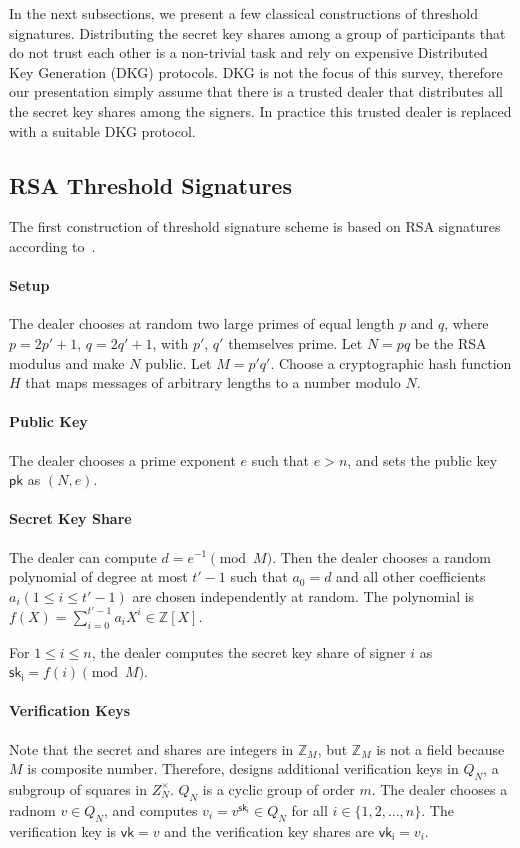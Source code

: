 \par In the next subsections, we present a few classical constructions of threshold signatures. Distributing the secret key shares among a group of participants that do not trust each other is a non-trivial task and rely on expensive Distributed Key Generation (DKG) protocols. DKG is not the focus of this survey, therefore our presentation simply assume that there is a trusted dealer that distributes all the secret key shares among the signers. In practice this trusted dealer is replaced with a suitable DKG protocol. 

\subsection{RSA Threshold Signatures}
The first construction of threshold signature scheme is based on RSA signatures according to~\cite{DBLP:conf/eurocrypt/Shoup00}. 

\paragraph{Setup} The dealer chooses at random two large primes of equal length $p$ and $q$, where $p=2p' + 1$, $q=2q'+1$, with $p'$, $q'$ themselves prime. Let $N=pq$ be the RSA modulus and make $N$ public. Let $M=p'q'$. Choose a cryptographic hash function $H$ that maps messages of arbitrary lengths to a number modulo $N$. 

\paragraph{Public Key} The dealer chooses a prime exponent $e$ such that $e>n$, and sets the public key $\mathsf{pk}$ as $(N, e)$. 

\paragraph{Secret Key Share} The dealer can compute $d=e^{-1}\pmod{M}$. Then the dealer chooses a random polynomial of degree at most $t'-1$ such that $a_0=d$ and all other coefficients $a_i (1\le i \le t'-1)$ are chosen independently at random. The polynomial is $f(X) = \sum_{i=0}^{t'-1}a_i X^i \in \mathbb{Z}[X]$. 

\par For $1\le i \le n$, the dealer computes the secret key share of signer $i$ as $\mathsf{sk_i} = f(i)\pmod M$. 

\paragraph{Verification Keys} Note that the secret and shares are integers in $\mathbb{Z}_M$, but $\mathbb{Z}_M$ is not a field because $M$ is composite number. Therefore, \cite{DBLP:conf/eurocrypt/Shoup00} designs additional verification keys in $Q_N$, a subgroup of squares in $Z_N^\times$. $Q_N$ is a cyclic group of order $m$. The dealer chooses a radnom $v\in Q_N$, and computes $v_i=v^{\mathsf{sk_i}}\in Q_N$ for all $i\in \{1, 2, \dots, n\}$. The verification key is $\mathsf{vk}=v$ and the verification key shares are $\mathsf{vk_i}=v_i$. 

